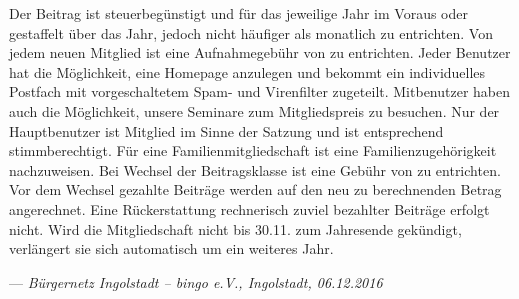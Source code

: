 Der Beitrag ist steuerbegünstigt und für das jeweilige Jahr im Voraus oder gestaffelt über das Jahr, 
jedoch nicht häufiger als monatlich zu entrichten.
Von jedem neuen Mitglied ist eine Aufnahmegebühr von  zu entrichten.
Jeder Benutzer hat die Möglichkeit, eine Homepage anzulegen
und bekommt ein individuelles Postfach mit vorgeschaltetem Spam- und Virenfilter zugeteilt.
\newline
Mitbenutzer haben auch die Möglichkeit, unsere Seminare zum Mitgliedspreis zu besuchen.
Nur der Hauptbenutzer ist Mitglied im Sinne der Satzung und ist entsprechend stimmberechtigt.
Für eine Familienmitgliedschaft ist eine Familienzugehörigkeit nachzuweisen.
\newline
Bei Wechsel der Beitragsklasse ist eine Gebühr von   zu entrichten.
Vor dem Wechsel gezahlte Beiträge werden auf den neu zu berechnenden Betrag angerechnet.
Eine Rückerstattung rechnerisch zuviel bezahlter Beiträge erfolgt nicht.
Wird die Mitgliedschaft nicht bis 30.11. zum Jahresende gekündigt,
verlängert sie sich automatisch um ein weiteres Jahr.

\hfill --- \textit{Bürgernetz Ingolstadt -- bingo e.V., Ingolstadt, 06.12.2016}
\newpage
